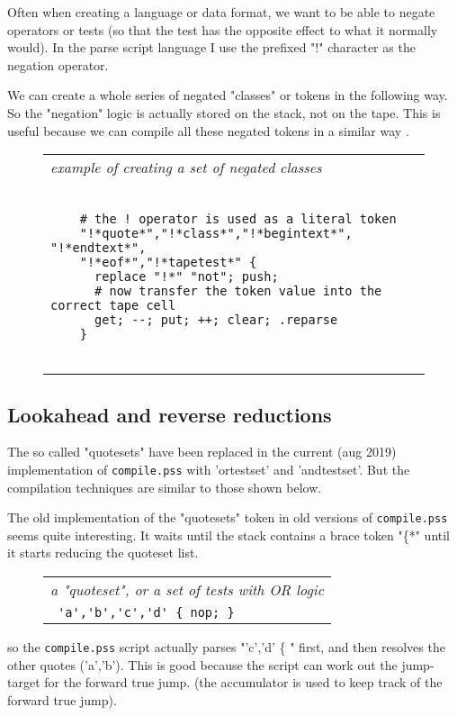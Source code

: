 \documentclass[a4paper,12pt]{article}
\begin{document}
  Often when creating a language or data format, we want to
  be able to negate operators or tests (so that the test has
  the opposite effect to what it normally would). In the parse
  script language I use the prefixed "!" character as the
  negation operator.

  We can create a whole series of negated "classes" or tokens in
  the following way. So the "negation" logic is actually stored
  on the stack, not on the tape. This is useful because we can
  compile all these negated tokens in a similar way .
 \begin{figure}
 \begin{tabular}{ l }
 \emph{ example of creating a set of negated classes } \\ 
 \begin{lstlisting}[breaklines] 

    # the ! operator is used as a literal token
    "!*quote*","!*class*","!*begintext*", "!*endtext*",
    "!*eof*","!*tapetest*" {
      replace "!*" "not"; push;
      # now transfer the token value into the correct tape cell
      get; --; put; ++; clear; .reparse
    }
  
 \end{lstlisting} 
 \end{tabular} 

 \end{figure}

\subsection{Lookahead and reverse reductions}

  The so called "quotesets" have been replaced in the current (aug 2019)
  implementation of \texttt{compile.pss} with 'ortestset' and 'andtestset'. But the
  compilation techniques are similar to those shown below.

  The old implementation of the "quotesets" token in old versions of
  \texttt{compile.pss} seems quite interesting. It waits until the stack contains a
  brace token "\{*" until it starts reducing the quoteset list.
 \begin{figure}
 \begin{tabular}{ l }
 \emph{ a "quoteset", or a set of tests with OR logic } \\ 
 \verb| 'a','b','c','d' { nop; } |
 \end{tabular} 
 \end{figure}

  so the \texttt{compile.pss} script actually parses "'c','d' \{ " first, and
  then resolves the other quotes ('a','b'). This is good because
  the script can work out the jump-target for the forward true jump.
  (the accumulator is used to keep track of the forward true jump).
\end{document}
